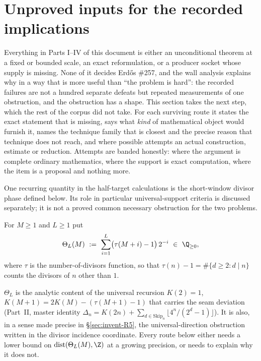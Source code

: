 \section{Unproved inputs for the recorded implications}
\label{sec:invent-257}

Everything in Parts I--IV of this document is either an unconditional theorem at a fixed or
bounded scale, an exact reformulation, or a producer socket whose supply is missing. None of it
decides Erd\H{o}s \#257, and the wall analysis explains why in a way that is more useful than
``the problem is hard'': the recorded failures are not a hundred separate defeats but repeated
measurements of one obstruction, and the obstruction has a shape. This section takes the next
step, which the rest of the corpus did not take. For each surviving route it states the exact
statement that is missing, says what \emph{kind} of mathematical object would furnish it, names
the technique family that is closest and the precise reason that technique does not reach, and
where possible attempts an actual construction, estimate or reduction. Attempts are banded
honestly:  where the argument is complete ordinary mathematics,  where the
support is exact computation,  where the item is a proposal and nothing more.

One recurring quantity in the half-target calculations is the short-window
divisor phase defined below.  Its role in particular universal-support
criteria is discussed separately; it is not a proved common necessary
obstruction for the two problems.

\begin{defn}
\label{defn:theta}
For $M\ge 1$ and $L\ge 1$ put
\[
\Theta_L(M)\ :=\ \sum_{i=1}^{L}\bigl(\tau(M+i)-1\bigr)\,2^{-i}\ \in\ \Q_{\ge 0},
\]
where $\tau$ is the number-of-divisors function, so that $\tau(n)-1=\#\{d\ge 2: d\mid n\}$ counts
the divisors of $n$ other than $1$.
\end{defn}

$\Theta_L$ is the analytic content of the universal recursion $K(2)=1$,
$K(M+1)=2K(M)-(\tau(M+1)-1)$ that carries the seam deviation (Part~II, master identity
$\Delta_n = K(2n)+\sum_{d\in\mathrm{Skip}_n}\lfloor 4^n/(2^d-1)\rfloor$). It is also, in a sense
made precise in \S\ref{sec:invent-R5}, the universal-direction obstruction written in the divisor
incidence coordinate. Every route below either needs a lower bound on
$\mathrm{dist}(\Theta_L(M),\Z)$ at a growing precision, or needs to explain why it does not.

